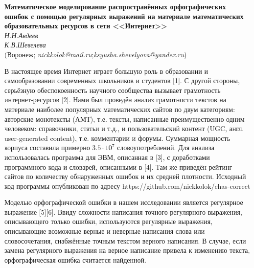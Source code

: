 \begin{center}{
	\bf
	Математическое моделирование распространённых орфографических ошибок
	с помощью регулярных выражений на материале математических образовательных ресурсов в сети <<Интернет>>
} \\
{\it Н.Н.Авдеев } \\  {\it К.В.Шевелева  } \\
(Воронеж; {\it nickkolok@mail.ru};{\it ksyusha.shevelyova@yandex.ru})
\end{center}

\setcounter{table}{0}


В настоящее время Интернет играет большую роль в образовании и самообразовании современных школьников и студентов [1].
С другой стороны, серьёзную обеспокоенность научного сообщества вызывает грамотность интернет-ресурсов [2].
Нами был проведён анализ грамотности текстов на материале наиболее популярных математических сайтов по двум категориям:
авторские монотексты (АМТ), т.е. тексты, написанные преимущественно одним человеком: справочники, статьи и т.д.,
и пользовательский контент
\linebreak
(UGC, англ. user-generated content), т.е. комментарии и форумы.
Суммарная мощность корпуса составила примерно $3.5\cdot 10^7$ словоупотреблений.
Для анализа использовалась программа для ЭВМ, описанная в [3], с доработками программного кода и словарей, описанными в [4].
Там же приведён рейтинг сайтов по количеству обнаруженных ошибок и их средней плотности.
Исходный код программы опубликован по адресу https://github.com/nickkolok/chas-correct

Моделью орфографической ошибки в нашем исследовании является регулярное выражение [5][6].
Ввиду сложности написания точного регулярного выражения,
описывающего только ошибки, используются регулярные выражения,
описывающие возможные верные и неверные написания слова или словосочетания,
снабжённые точным текстом верного написания.
В случае, если замена регулярного выражения на верное написание привела к изменению текста,
орфографическая ошибка считается найденной.

